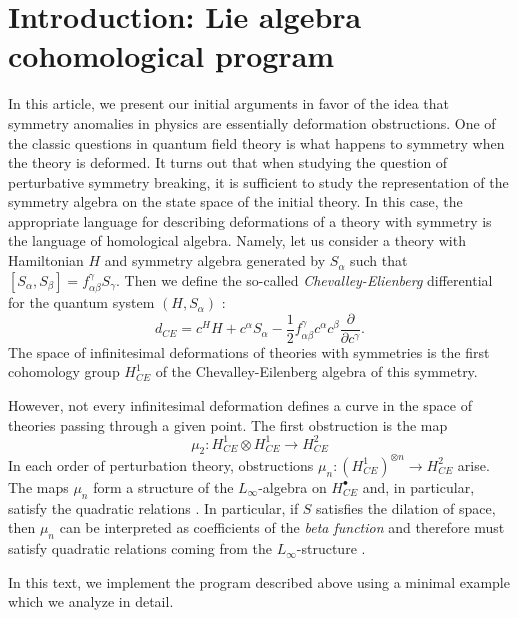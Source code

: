 \documentclass[10pt,a4paper]{amsart}
\theoremstyle{definition}
\begin{document}
\section{Introduction: Lie algebra cohomological program}
In this article, we present our initial arguments in favor of the idea that symmetry anomalies in physics are essentially deformation obstructions. One of the classic questions in quantum field theory is what happens to symmetry when the theory is deformed. It turns out that when studying the question of perturbative symmetry breaking, it is sufficient to study the representation of the symmetry algebra on the state space of the initial theory. In this case, the appropriate language for describing deformations of a theory with symmetry is the language of homological algebra. Namely, let us consider a theory with Hamiltonian $H$ and symmetry algebra generated by $S_{\alpha}$ such that $[S_{\alpha},S_{\beta}]=f_{\alpha\beta}^{\gamma}S_{\gamma}$. Then we define the so-called \emph{Chevalley-Elienberg} differential for the quantum system $(H,S_{\alpha})$ \cite{Losev:2023exl}:
\begin{equation}
    d_{CE}=c^{H}H+c^{\alpha}S_{\alpha}-\frac{1}{2}f_{\alpha\beta}^{\gamma}c^{\alpha}c^{\beta}\frac{\partial}{\partial c^{\gamma}}.
\end{equation}
The space of infinitesimal deformations of theories with symmetries is the first cohomology group $H^{1}_{CE}$ of the Chevalley-Eilenberg algebra of this symmetry.

However, not every infinitesimal deformation defines a curve in the space of theories passing through a given point. The first obstruction is the map 
\begin{equation}
    \mu_{2}: H^{1}_{CE}\otimes H^{1}_{CE}\rightarrow H^{2}_{CE}
\end{equation}
In each order of perturbation theory, obstructions $\mu_{n}: (H^{1}_{CE})^{\otimes n} \rightarrow H^{2}_{CE}$ arise. The maps $\mu_{n}$ form a structure of the $L_{\infty}$-algebra on $H^{\bullet}_{CE}$ and, in particular, satisfy the quadratic relations \cite{kontsevich2000deformation}. In particular, if $S$ satisfies the dilation of space, then $\mu_{n}$ can be interpreted as coefficients of the \emph{beta function} and therefore must satisfy quadratic relations coming from the $L_{\infty}$-structure \cite{Losev:2005pu, Gamayun:2023sif}.

In this text, we implement the program described above using a minimal example which we analyze in detail. 
\end{document}
